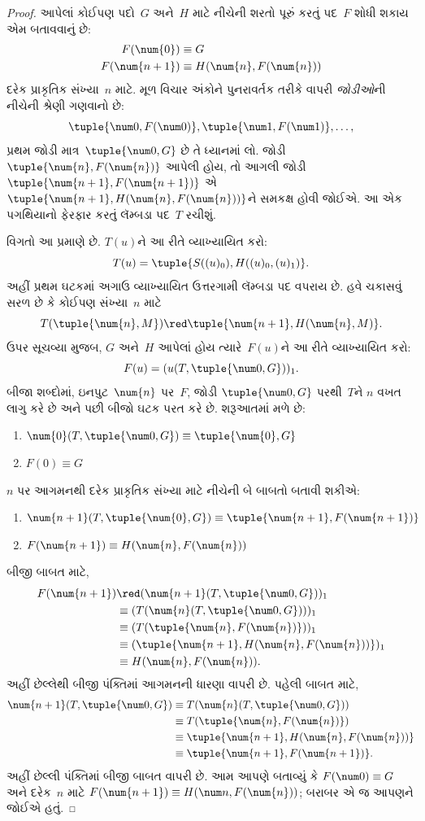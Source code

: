 \begin{proof}
આપેલાં કોઈપણ પદો~$G$ અને~$H$ માટે નીચેની શરતો પૂરું કરતું
પદ~$F$ શોધી શકાય એમ બતાવવાનું છે:
\begin{align*}
F(\num{0}) & \equiv G \\
F(\num{n+1}) & \equiv H(\num{n}, F(\num{n}))
\end{align*}
દરેક પ્રાકૃતિક સંખ્યા~$n$ માટે. મૂળ વિચાર અંકોને પુનરાવર્તક તરીકે
વાપરી \emph{જોડીઓ}ની નીચેની શ્રેણી ગણવાનો છે:
\[
\tuple{\num 0, F(\num 0)}, \tuple{\num 1, F(\num 1)}, \dots,
\]
પ્રથમ જોડી માત્ર~$\tuple{\num 0, G}$ છે તે ધ્યાનમાં લો. જોડી
$\tuple{\num{n}, F(\num{n})}$ આપેલી હોય, તો આગલી જોડી
$\tuple{\num{n+1}, F(\num{n+1})}$ એ
$\tuple{\num{n+1}, H(\num{n}, F(\num{n}))}$ને સમકક્ષ હોવી
જોઈએ. આ એક પગથિયાનો ફેરફાર કરતું લૅમ્બડા પદ~$T$ રચીશું.

વિગતો આ પ્રમાણે છે. $T(u)$ને આ રીતે વ્યાખ્યાયિત કરો:
\[
T(u) = \tuple{S((u)_0), H((u)_0,(u)_1)}.
\]
અહીં પ્રથમ ઘટકમાં અગાઉ વ્યાખ્યાયિત ઉત્તરગામી લૅમ્બડા પદ વપરાય છે.
હવે ચકાસવું સરળ છે કે કોઈપણ સંખ્યા~$n$ માટે
\[
T(\tuple{\num{n}, M}) \red \tuple{\num{n+1}, H(\num{n}, M)}.
\]
ઉપર સૂચવ્યા મુજબ, $G$ અને~$H$ આપેલાં હોય ત્યારે~$F(u)$ને
આ રીતે વ્યાખ્યાયિત કરો:
\[
F(u) = (u(T,\tuple{\num 0, G}))_1.
\]
બીજા શબ્દોમાં, ઇનપુટ~$\num{n}$ પર~$F$, જોડી
$\tuple{\num 0, G}$ પરથી~$T$ને $n$ વખત લાગુ કરે છે અને પછી
બીજો ઘટક પરત કરે છે. શરૂઆતમાં મળે છે:
\begin{enumerate}
\item $\num{0} (T, \tuple{\num 0, G}) \equiv \tuple{\num{0}, G}$
\item $F(\num{0}) \equiv G$
\end{enumerate}
$n$ પર આગમનથી દરેક પ્રાકૃતિક સંખ્યા માટે નીચેની બે બાબતો
બતાવી શકીએ:
\begin{enumerate}
\item $\num{n+1}(T, \tuple{\num{0}, G}) \equiv \tuple{\num{n+1}, F(\num{n+1})}$
\item $F(\num{n+1}) \equiv H(\num{n}, F(\num{n}))$
\end{enumerate}
બીજી બાબત માટે,
\begin{align*}
F(\num{n+1}) & \red (\num{n+1}(T, \tuple{\num 0, G}))_1 \\
& \equiv (T(\num{n} (T, \tuple{\num 0, G})))_1 \\
& \equiv (T(\tuple{\num{n}, F(\num{n})}))_1 \\
& \equiv (\tuple{\num{n+1}, H(\num{n}, F(\num{n}))})_1 \\
& \equiv H(\num{n}, F(\num{n})).
\end{align*}
અહીં છેલ્લેથી બીજી પંક્તિમાં આગમનની ધારણા વાપરી છે. પહેલી
બાબત માટે,
\begin{align*}
\num{n+1} (T, \tuple{\num 0, G}) &
\equiv T(\num{n} (T, \tuple{\num 0, G})) \\
& \equiv T( \tuple{\num{n}, F(\num{n})}) \\
& \equiv \tuple{\num{n+1}, H(\num{n}, F(\num{n}))} \\
& \equiv \tuple{\num{n+1}, F(\num{n+1})}.
\end{align*}
અહીં છેલ્લી પંક્તિમાં બીજી બાબત વાપરી છે. આમ આપણે બતાવ્યું કે
$F(\num 0) \equiv G$ અને દરેક~$n$ માટે
$F(\num {n+1}) \equiv H(\num n, F(\num{n}))$; બરાબર એ જ
આપણને જોઈએ હતું.
\end{proof}
